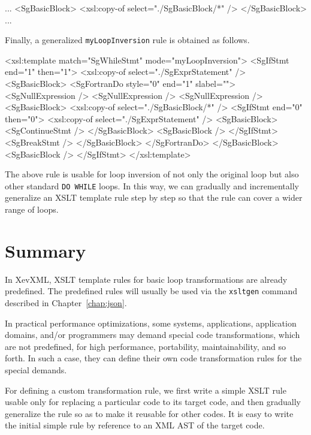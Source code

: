 \begin{framed}
\begin{src}
...
<SgBasicBlock>
  <xsl:copy-of select="./SgBasicBlock/*" />
</SgBasicBlock>
...
\end{src}
\end{framed}

Finally, a generalized \texttt{myLoopInversion} rule is obtained as follows.
\begin{framed}
\begin{src}
<xsl:template match="SgWhileStmt" mode="myLoopInversion">
  <SgIfStmt end="1" then="1">
    <xsl:copy-of select="./SgExprStatement" />
    <SgBasicBlock>
      <SgFortranDo style="0" end="1" slabel="">
	<SgNullExpression />
	<SgNullExpression />
	<SgNullExpression />
	<SgBasicBlock>
	  <xsl:copy-of select="./SgBasicBlock/*" />
	  <SgIfStmt end="0" then="0">
	    <xsl:copy-of select="./SgExprStatement" />
	    <SgBasicBlock>
	      <SgContinueStmt />
	    </SgBasicBlock>
	    <SgBasicBlock />
	  </SgIfStmt>
	  <SgBreakStmt />
	</SgBasicBlock>
      </SgFortranDo>
    </SgBasicBlock>
    <SgBasicBlock />
  </SgIfStmt>
</xsl:template>
\end{src}
\end{framed}

The above rule is usable for loop inversion of not only the original
loop but also other standard \texttt{DO WHILE} loops.  In this way, we
can gradually and incrementally generalize an XSLT template rule step by
step so that the rule can cover a wider range of loops.  

\section{Summary}

In XevXML, XSLT template rules for basic loop transformations are
already predefined. The predefined rules will usually be used via the
\texttt{xsltgen} command described in Chapter~\ref{chap:json}.

In practical performance optimizations, some systems, applications,
application domains, and/or programmers may demand special code
transformations, which are not predefined, for high performance,
portability, maintainability, and so forth.  In such a case, they can
define their own code transformation rules for the special demands.

For defining a custom transformation rule, we first write a simple XSLT
rule usable only for replacing a particular code to its target code, and
then gradually generalize the rule so as to make it reusable for other
codes.  It is easy to write the initial simple rule by reference to an
XML AST of the target code.


